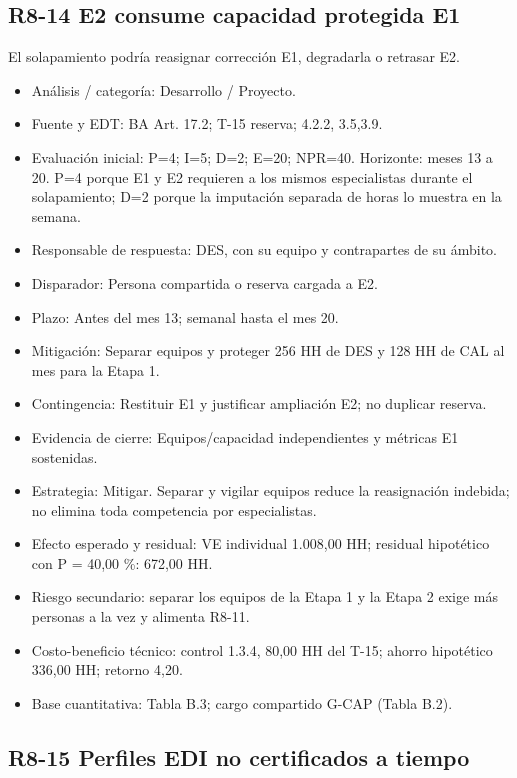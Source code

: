 \subsection*{R8-14 \textemdash{} E2 consume capacidad protegida E1}

El solapamiento podría reasignar corrección E1, degradarla o retrasar E2.

\begin{itemize}[leftmargin=*,itemsep=3pt]
\item Análisis / categoría: Desarrollo / Proyecto.
\item Fuente y EDT: BA Art. 17.2; T-15 reserva; 4.2.2, 3.5,3.9.
\item Evaluación inicial: P=4; I=5; D=2; E=20; NPR=40. Horizonte: meses 13 a 20. P=4 porque E1 y E2 requieren a los mismos especialistas durante el solapamiento; D=2 porque la imputación separada de horas lo muestra en la semana.
\item Responsable de respuesta: DES, con su equipo y contrapartes de su ámbito.
\item Disparador: Persona compartida o reserva cargada a E2.
\item Plazo: Antes del mes 13; semanal hasta el mes 20.
\item Mitigación: Separar equipos y proteger 256 HH de DES y 128 HH de CAL al mes para la Etapa 1.
\item Contingencia: Restituir E1 y justificar ampliación E2; no duplicar reserva.
\item Evidencia de cierre: Equipos/capacidad independientes y métricas E1 sostenidas.
\item Estrategia: Mitigar. Separar y vigilar equipos reduce la reasignación indebida; no elimina toda competencia por especialistas.
\item Efecto esperado y residual: VE individual 1.008,00 HH; residual hipotético con P = 40,00 \%: 672,00 HH.
\item Riesgo secundario: separar los equipos de la Etapa 1 y la Etapa 2 exige más personas a la vez y alimenta R8-11.
\item Costo-beneficio técnico: control 1.3.4, 80,00 HH del T-15; ahorro hipotético 336,00 HH; retorno 4,20.
\item Base cuantitativa: Tabla B.3; cargo compartido G-CAP (Tabla B.2).
\end{itemize}

\subsection*{R8-15 \textemdash{} Perfiles EDI no certificados a tiempo}

